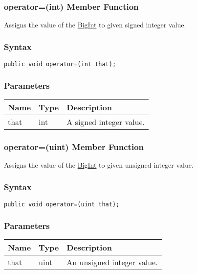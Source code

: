\documentclass[a4paper,oneside,11.000000pt]{book}
\begin{document}
\hypertarget{System.Numerics.Multiprecision.BigInt.operator.assign.P.System.Numerics.Multiprecision.BigInt.int}{\subsubsection*{operator=(int) Member Function}}
\begin{flushleft}
Assigns the value of the \hyperlink{System.Numerics.Multiprecision.BigInt}{BigInt} to given signed integer value.

\end{flushleft}
\subsubsection*{Syntax}\texttt{public void operator=(int that);}

\subsubsection*{Parameters}
\begin{flushleft}
\begin{supertabular}[l]{lll}
\textbf{Name}
& \textbf{Type}
& \textbf{Description}
\\
\hline
that
& int
& A signed integer value.

\\
\end{supertabular}

\end{flushleft}
\clearpage

\hypertarget{System.Numerics.Multiprecision.BigInt.operator.assign.P.System.Numerics.Multiprecision.BigInt.uint}{\subsubsection*{operator=(uint) Member Function}}
\begin{flushleft}
Assigns the value of the \hyperlink{System.Numerics.Multiprecision.BigInt}{BigInt} to given unsigned integer value.

\end{flushleft}
\subsubsection*{Syntax}\texttt{public void operator=(uint that);}

\subsubsection*{Parameters}
\begin{flushleft}
\begin{supertabular}[l]{lll}
\textbf{Name}
& \textbf{Type}
& \textbf{Description}
\\
\hline
that
& uint
& An unsigned integer value.

\\
\end{supertabular}

\end{flushleft}
\clearpage
\end{document}
